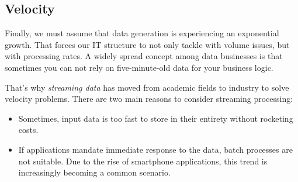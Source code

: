 \subsection{Velocity}

Finally, we must assume that data generation is experiencing an exponential growth. That forces our IT structure to not only tackle with volume issues, but with processing rates. A widely spread concept among data businesses is that sometimes you can not rely on five-minute-old data for your business logic.

That's why \textit{streaming data} has moved from academic fields to industry to solve velocity problems. There are two main reasons to consider streaming processing:
\begin{itemize}
	\item Sometimes, input data is too fast to store in their entirety without rocketing costs.
	\item If applications mandate immediate response to the data, batch processes are not suitable. Due to the rise of smartphone applications, this trend is increasingly becoming a common scenario.
\end{itemize}
